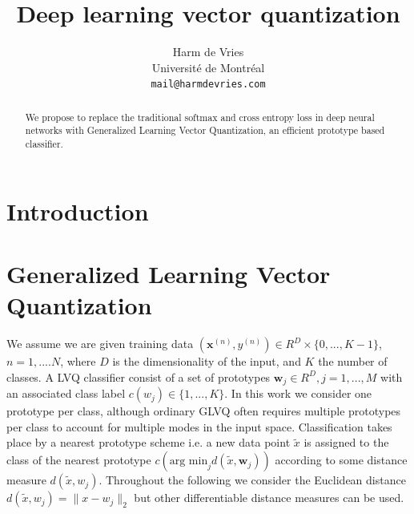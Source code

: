 \documentclass{article} %
\title{Deep learning vector quantization}
\author{
Harm de Vries\\
Universit\'{e} de Montr\'{e}al\\
\texttt{mail@harmdevries.com} \\
}
\begin{document}
\maketitle

\begin{abstract}
We propose to replace the traditional softmax and cross entropy loss in deep neural networks with Generalized Learning Vector Quantization, an efficient prototype based classifier. 
\end{abstract}

\section{Introduction}



\section{Generalized Learning Vector Quantization}
We assume we are given training data $(\mathbf{x}^{(n)}, y^{(n)}) \in R^D \times \{0, ..., K-1\}$, $n=1, .... N$, where $D$ is the dimensionality of the input, and $K$ the number of classes. A LVQ classifier consist of a set of prototypes ${\mathbf{w}_j} \in R^D, j=1, ..., M$ with an associated class label $c(w_j) \in \{1, ..., K\}$. In this work we consider one prototype per class, although ordinary GLVQ often requires multiple prototypes per class to account for multiple modes in the input space. Classification takes place by a nearest prototype scheme i.e. a new data point $\tilde{x}$ is assigned to the class of the nearest prototype $c(\mbox{arg min}_j d(\tilde{x}, \mathbf{w}_j))$ according to some distance measure $d(\tilde{x}, w_j)$. Throughout the following we consider the Euclidean distance $d(\tilde{x}, w_j) = \|x - w_j\|_2$ but other differentiable distance measures can be used. 
\end{document}
